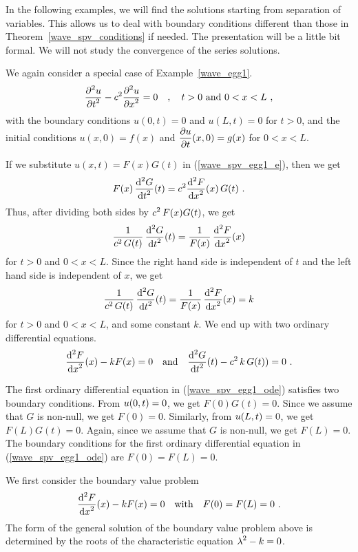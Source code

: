 In the following examples, we will find the solutions starting from
separation of variables.  This allows us to deal with boundary
conditions different than those in Theorem~\ref{wave_spv_conditions}
if needed.  The presentation will be a little bit formal.  We will not
study the convergence of the series solutions.

\begin{egg}
We again consider a special case of Example~\ref{wave_egg1}.
\begin{equation} \label{wave_spv_egg1_e}
\frac{\displaystyle \partial^{2}{u}} {\displaystyle \partial t^{2}} - c^2 \frac{\displaystyle \partial^{2}{u}} {\displaystyle \partial x^{2}} = 0 \quad , \quad t>0
\ \text{and} \ 0 < x <L \ ,
\end{equation}
with the boundary conditions $u(0,t) = 0$ and $u(L,t) = 0$ for $t>0$,
and the initial conditions
$u(x,0) = f(x)$ and $\displaystyle \frac{\partial{u}}{\partial t}(x,0) = g(x)$ for
$0 < x < L$.              \label{wave_spv_egg1}

If we substitute $u(x,t) = F(x)G(t)$ in (\ref{wave_spv_egg1_e}), then we get
\[
F(x)\,\frac{\displaystyle \mathrm{d}^{2}{G}} {\displaystyle \mathrm{d}{t}^{2}}(t) = c^2 \frac{\displaystyle \mathrm{d}^{2}{F}} {\displaystyle \mathrm{d}{x}^{2}}(x)\, G(t) \ .
\]
Thus, after dividing both sides by $\displaystyle c^2\,F(x)G(t)$, we get
\[
\frac{1}{c^2\,G(t)} \, \frac{\displaystyle \mathrm{d}^{2}{G}} {\displaystyle \mathrm{d}{t}^{2}}(t) =
\frac{1}{F(x)}\, \frac{\displaystyle \mathrm{d}^{2}{F}} {\displaystyle \mathrm{d}{x}^{2}}(x)
\]
for $t>0$ and $0<x<L$.  Since the right hand side is independent of
$t$ and the left hand side is independent of $x$, we get
\[
\frac{1}{c^2\,G(t)} \, \frac{\displaystyle \mathrm{d}^{2}{G}} {\displaystyle \mathrm{d}{t}^{2}}(t) = \frac{1}{F(x)}\,
\frac{\displaystyle \mathrm{d}^{2}{F}} {\displaystyle \mathrm{d}{x}^{2}}(x) = k
\]
for $t>0$ and $0<x<L$, and some constant $k$.  We end up with two
ordinary differential equations.
\begin{equation} \label{wave_spv_egg1_ode}
\frac{\displaystyle \mathrm{d}^{2}{F}} {\displaystyle \mathrm{d}{x}^{2}}(x) -k F(x) = 0 \quad \text{and}
\quad \frac{\displaystyle \mathrm{d}^{2}{G}} {\displaystyle \mathrm{d}{t}^{2}}(t) - c^2\,k\,G(t)) = 0 \ .
\end{equation}

The first ordinary differential equation in (\ref{wave_spv_egg1_ode})
satisfies two boundary conditions.   From $\displaystyle u(0,t) = 0$, we get
$F(0)G(t)=0$.  Since we assume that $G$ is non-null, we get
$F(0)=0$.  Similarly, from $\displaystyle u(L,t) = 0$, we
get $F(L)G(t)=0$.  Again, since we assume that $G$ is non-null, we
get $F(L)=0$.  The boundary conditions for 
the first ordinary differential equation in (\ref{wave_spv_egg1_ode})
are $F(0)=F(L)=0$.

We first consider the boundary value problem
\begin{equation} \label{wave_spv_egg1_bvp}
\dydxn{F}{x}{2}(x) -k F(x) = 0 \quad \text{with} \quad F(0)=F(L)=0  \ .
\end{equation}
The form of the general solution of the boundary value problem above
is determined by the roots of the characteristic equation
$\displaystyle \lambda^2-k=0$.


\end{egg}
